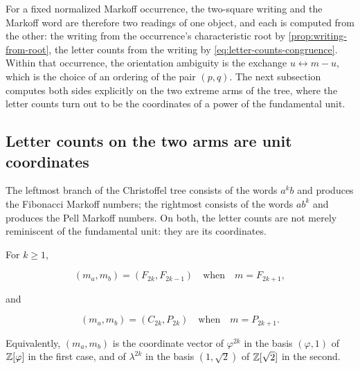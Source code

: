 For a fixed normalized Markoff occurrence, the two-square writing and the
Markoff word are therefore two readings of one object, and each is computed
from the other: the writing from the occurrence's characteristic root by
\cref{prop:writing-from-root}, the letter counts from the writing by
\cref{eq:letter-counts-congruence}. Within that occurrence, the orientation
ambiguity is the exchange $u\leftrightarrow m-u$, which is the choice of an
ordering of the pair $(p,q)$. The next subsection computes both sides
explicitly on the two extreme arms of the tree, where the letter counts turn
out to be the coordinates of a power of the fundamental unit.

\subsection{Letter counts on the two arms are unit coordinates}

The leftmost branch of the Christoffel tree consists of the words $a^kb$
and produces the Fibonacci Markoff numbers; the rightmost consists of the
words $ab^k$ and produces the Pell Markoff numbers. On both, the letter
counts are not merely reminiscent of the fundamental unit: they are its
coordinates.

\begin{proposition}
\label{prop:arm-letter-counts}
For $k\geqslant1$,

\begin{equation}
 (m_a,m_b)=(F_{2k},F_{2k-1})
 \quad\text{when}\quad
 m=F_{2k+1},
 \label{eq:fib-arm-counts}
\end{equation}

and

\begin{equation}
 (m_a,m_b)=(C_{2k},P_{2k})
 \quad\text{when}\quad
 m=P_{2k+1}.
 \label{eq:pell-arm-counts}
\end{equation}

Equivalently, $(m_a,m_b)$ is the coordinate vector of $\varphi^{2k}$ in the
basis $(\varphi,1)$ of $\mathbb{Z}[\varphi]$ in the first case, and of $\lambda^{2k}$
in the basis $(1,\sqrt2)$ of $\mathbb{Z}[\sqrt2]$ in the second.
\end{proposition}

